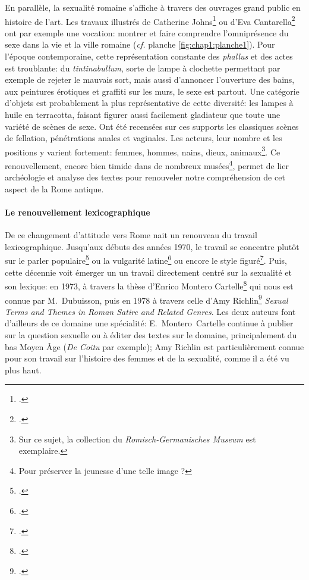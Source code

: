 En parallèle, la sexualité romaine s'affiche à travers des ouvrages grand public en histoire de l'art. Les travaux illustrés de Catherine Johns\footcite{johns2000sex} ou d'Eva Cantarella\footcite{cantarella_pompei_2000} ont par exemple une vocation: montrer et faire comprendre l'omniprésence du sexe dans la vie et la ville romaine (\textit{cf.} planche \ref{fig:chap1:planche1}). Pour l'époque contemporaine, cette représentation constante des \textit{phallus} et des actes est troublante: du \textit{tintinabullum}, sorte de lampe à clochette permettant par exemple de rejeter le mauvais sort, mais aussi d'annoncer l'ouverture des bains, aux peintures érotiques et graffiti sur les murs, le sexe est partout. Une catégorie d'objets est probablement la plus représentative de cette diversité: les lampes à huile en terracotta, faisant figurer aussi facilement gladiateur que toute une variété de scènes de sexe. Ont été recensées sur ces supports les classiques scènes de fellation, pénétrations anales et vaginales. Les acteurs, leur nombre et les positions y varient fortement: femmes, hommes, nains, dieux, animaux\footnote{Sur ce sujet, la collection du \textit{Romisch-Germanisches Museum} est exemplaire.}. Ce renouvellement, encore bien timide dans de nombreux musées\footnote{Pour préserver la jeunesse d'une telle image ?}, permet de lier archéologie et analyse des textes pour renouveler notre compréhension de cet aspect de la Rome antique.

\paragraph{Le renouvellement lexicographique}

De ce changement d'attitude vers Rome nait un renouveau du travail lexicographique. Jusqu'aux débuts des années 1970, le travail se concentre plutôt sur le parler populaire\footcite{otto_sprichworter_1890} ou la vulgarité latine\footcite{opelt1970schimpfworter} ou encore le style figuré\footcite{opelt1966euphemismus}. Puis, cette décennie voit émerger un un travail directement centré sur la sexualité et son lexique: en 1973, à travers la thèse d'Enrico Montero Cartelle\footcite{montero_cartelle_aspectos_1973} qui nous est connue par M.~Dubuisson, puis en 1978 à travers celle d'Amy Richlin\footcite{richlin_sexual_1978} \textit{Sexual Terms and Themes in Roman Satire and Related Genres}. Les deux auteurs font d'ailleurs de ce domaine une spécialité: E.~Montero~Cartelle continue à publier sur la question sexuelle ou à éditer des textes sur le domaine, principalement du bas Moyen Âge (\textit{De Coitu} par exemple); Amy Richlin est particulièrement connue pour son travail sur l'histoire des femmes et de la sexualité, comme il a été vu plus haut. 

